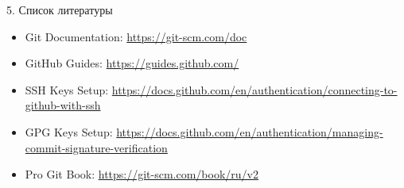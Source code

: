 \documentclass[
  ignorenonframetext,
  aspectratio=169,
]{beamer}
\providecommand{\tightlist}{%
  \setlength{\itemsep}{0pt}\setlength{\parskip}{0pt}}\usepackage{longtable,booktabs,array}
\newlength{\cslhangindent}
\newenvironment{CSLReferences}[2] %
 {\begin{list}{}{%
  \setlength{\itemindent}{0pt}
  \setlength{\leftmargin}{0pt}
  \setlength{\parsep}{0pt}
  \ifodd #1
   \setlength{\leftmargin}{\cslhangindent}
   \setlength{\itemindent}{-1\cslhangindent}
  \fi
  \setlength{\itemsep}{#2\baselineskip}}}
 {\end{list}}
\begin{document}
\begin{frame}{5. Список литературы}
\label{ux441ux43fux438ux441ux43eux43a-ux43bux438ux442ux435ux440ux430ux442ux443ux440ux44b}
\label{refs}
\begin{CSLReferences}{0}{1}
\begin{itemize}[<+->]
\tightlist
\item
  Git Documentation: \url{https://git-scm.com/doc}
\item
  GitHub Guides: \url{https://guides.github.com/}
\item
  SSH Keys Setup:
  \url{https://docs.github.com/en/authentication/connecting-to-github-with-ssh}
\item
  GPG Keys Setup:
  \url{https://docs.github.com/en/authentication/managing-commit-signature-verification}
\item
  Pro Git Book: \url{https://git-scm.com/book/ru/v2}
\end{itemize}

\end{CSLReferences}
\end{frame}
\end{document}
